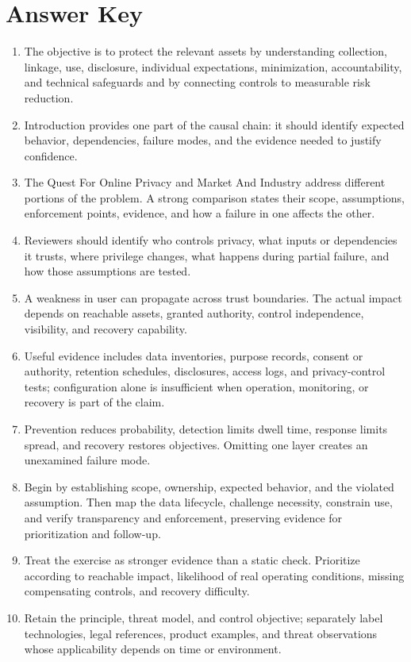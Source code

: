 \documentclass[11pt,letterpaper]{article}
\begin{document}
\section*{Answer Key}
\begin{enumerate}
\item The objective is to protect the relevant assets by understanding collection, linkage, use, disclosure, individual expectations, minimization, accountability, and technical safeguards and by connecting controls to measurable risk reduction.
\item Introduction provides one part of the causal chain: it should identify expected behavior, dependencies, failure modes, and the evidence needed to justify confidence.
\item The Quest For Online Privacy and Market And Industry address different portions of the problem. A strong comparison states their scope, assumptions, enforcement points, evidence, and how a failure in one affects the other.
\item Reviewers should identify who controls privacy, what inputs or dependencies it trusts, where privilege changes, what happens during partial failure, and how those assumptions are tested.
\item A weakness in user can propagate across trust boundaries. The actual impact depends on reachable assets, granted authority, control independence, visibility, and recovery capability.
\item Useful evidence includes data inventories, purpose records, consent or authority, retention schedules, disclosures, access logs, and privacy-control tests; configuration alone is insufficient when operation, monitoring, or recovery is part of the claim.
\item Prevention reduces probability, detection limits dwell time, response limits spread, and recovery restores objectives. Omitting one layer creates an unexamined failure mode.
\item Begin by establishing scope, ownership, expected behavior, and the violated assumption. Then map the data lifecycle, challenge necessity, constrain use, and verify transparency and enforcement, preserving evidence for prioritization and follow-up.
\item Treat the exercise as stronger evidence than a static check. Prioritize according to reachable impact, likelihood of real operating conditions, missing compensating controls, and recovery difficulty.
\item Retain the principle, threat model, and control objective; separately label technologies, legal references, product examples, and threat observations whose applicability depends on time or environment.
\end{enumerate}
\end{document}

